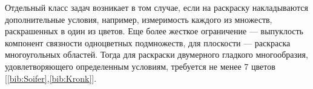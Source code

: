 Отдельный класс задач возникает в том случае, если на раскраску накладываются дополнительные условия, например, измеримость каждого из множеств, раскрашенных в один из цветов. Еще более жесткое ограничение — выпуклость компонент связности одноцветных подмножеств, для плоскости — раскраска многоугольных областей. Тогда для раскраски двумерного гладкого многообразия, удовлетворяющего определенным условиям, требуется не менее 7 цветов [\ref{bib:Soifer},\ref{bib:Kronk}].